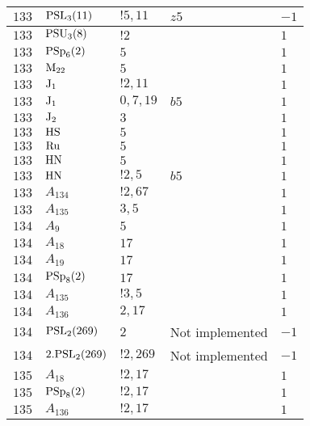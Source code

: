\documentclass[a4paper, 11pt]{article}
\begin{document}
\begin{longtable}{lllll}
        $ 133 $ & $ {\rm PSL}_{3}(11) $ & $ ! 5,11 $ & $ z5 $ & $ -1$ \\ \hline
        $ 133 $ & $ {\rm PSU}_{3}(8) $ & $ ! 2 $ & $ ~ $ & $ 1$ \\ \hline
        $ 133 $ & $ {\rm PSp}_{6}(2) $ & $ 5 $ & $ ~ $ & $ 1$ \\ \hline
        $ 133 $ & $ {\rm M}_{22} $ & $ 5 $ & $ ~ $ & $ 1$ \\ \hline
        $ 133 $ & $ {\rm J}_1 $ & $ ! 2,11 $ & $ ~ $ & $ 1$ \\ \hline
        $ 133 $ & $ {\rm J}_1 $ & $ 0,7,19 $ & $ b5 $ & $ 1$ \\ \hline
        $ 133 $ & $ {\rm J}_2 $ & $ 3 $ & $ ~ $ & $ 1$ \\ \hline
        $ 133 $ & $ {\rm HS} $ & $ 5 $ & $ ~ $ & $ 1$ \\ \hline
        $ 133 $ & $ {\rm Ru} $ & $ 5 $ & $ ~ $ & $ 1$ \\ \hline
        $ 133 $ & $ {\rm HN} $ & $ 5 $ & $ ~ $ & $ 1$ \\ \hline
        $ 133 $ & $ {\rm HN} $ & $ ! 2,5 $ & $ b5 $ & $ 1$ \\ \hline
        $ 133 $ & $ A_{134} $ & $ !2, 67 $ & $ ~ $ & $ 1$ \\ \hline
        $ 133 $ & $ A_{135} $ & $ 3, 5 $ & $ ~ $ & $ 1$ \\ \hline
        $ 134 $ & $ A_{9} $ & $ 5 $ & $ ~ $ & $ 1$ \\ \hline
        $ 134 $ & $ A_{18} $ & $ 17 $ & $ ~ $ & $ 1$ \\ \hline
        $ 134 $ & $ A_{19} $ & $ 17 $ & $ ~ $ & $ 1$ \\ \hline
        $ 134 $ & $ {\rm PSp}_{8}(2) $ & $ 17 $ & $ ~ $ & $ 1$ \\ \hline
        $ 134 $ & $ A_{135} $ & $ !3, 5 $ & $ ~ $ & $ 1$ \\ \hline
        $ 134 $ & $ A_{136} $ & $ 2, 17 $ & $ ~ $ & $ 1$ \\ \hline
        $ 134 $ & $ {\rm PSL}_{2}(269) $ & $ 2 $ &  Not implemented & $ -1$ \\ \hline
        $ 134 $ & $ 2.{\rm PSL}_{2}(269) $ & $ !2, 269 $ &  Not implemented & $ -1$ \\ \hline
        $ 135 $ & $ A_{18} $ & $ ! 2,17 $ & $ ~ $ & $ 1$ \\ \hline
        $ 135 $ & $ {\rm PSp}_{8}(2) $ & $ ! 2,17 $ & $ ~ $ & $ 1$ \\ \hline
        $ 135 $ & $ A_{136} $ & $ !2, 17 $ & $ ~ $ & $ 1$ \\ \hline

\end{longtable}
\end{document}
